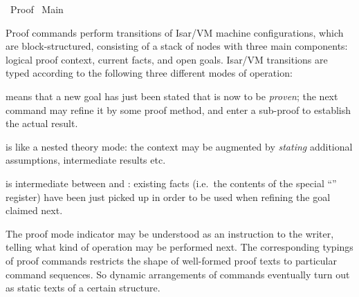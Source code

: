 %
\begin{isabellebody}%
\def\isabellecontext{Proof}%
%
\isadelimtheory
%
\endisadelimtheory
%
\isatagtheory
{}\isamarkupfalse%
\ Proof\isanewline
{}\ Main\isanewline
{}%
\endisatagtheory
{\isafoldtheory}%
%
\isadelimtheory
%
\endisadelimtheory
%
\isamarkuptrue%
%
\begin{isamarkuptext}%
Proof commands perform transitions of Isar/VM machine
  configurations, which are block-structured, consisting of a stack of
  nodes with three main components: logical proof context, current
  facts, and open goals.  Isar/VM transitions are typed according to
  the following three different modes of operation:

  \begin{description}

  \item {} means that a new goal has just been
  stated that is now to be \emph{proven}; the next command may refine
  it by some proof method, and enter a sub-proof to establish the
  actual result.

  \item {} is like a nested theory mode: the
  context may be augmented by \emph{stating} additional assumptions,
  intermediate results etc.

  \item {} is intermediate between  and : existing facts (i.e.\
  the contents of the special ``\hyperlink{fact.this}{\mbox{}}'' register) have been
  just picked up in order to be used when refining the goal claimed
  next.

  \end{description}

  The proof mode indicator may be understood as an instruction to the
  writer, telling what kind of operation may be performed next.  The
  corresponding typings of proof commands restricts the shape of
  well-formed proof texts to particular command sequences.  So dynamic
  arrangements of commands eventually turn out as static texts of a
  certain structure.


\end{isamarkuptext}
\end{isabellebody}
